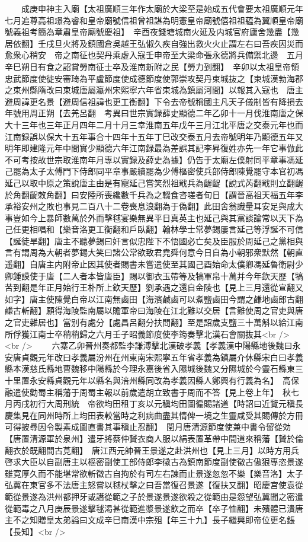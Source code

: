 　　成庚申神主入廟【太祖廣順三年作太廟於大梁至是始成五代會要太祖廣順元年七月追尊高祖璟為睿和皇帝廟號信祖曾祖諶為明憲皇帝廟號僖祖祖藴為翼順皇帝廟號義祖考簡為章肅皇帝廟號慶祖】　辛酉夜錢塘城南火延及内城官府廬舍幾盡【幾居依翻】壬戌旦火將及鎮國倉吳越王弘俶久疾自強出救火火止謂左右曰吾疾因災而愈衆心稍安　帝之南征也契丹乘虚入寇壬申帝至大梁命張永德將兵備禦北邊　五月辛巳朔日有食之詔賞勞南征士卒及淮南新附之民【勞力到翻】　辛卯以太祖皇帝領忠武節度使徙安審琦為平盧節度使成德節度使郭崇攻契丹束城抜之【束城漢勃海郡之束州縣隋改曰束城唐屬瀛州宋熙寧六年省束城為鎮屬河間】以報其入寇也　唐主避周諱更名景【避周信祖諱也更工衡翻】下令去帝號稱國主凡天子儀制皆有降損去年號用周正朔【去羌呂翻　考異曰世宗實録薛史顯德二年乙卯十一月伐淮南唐之保大十三年也三年正月四年二月十月三幸淮南五年戊午三月江北平唐之交泰元年也而江南録誤以保大十五年事合十四年十五年丁巳改交泰五月去帝號明年乃顯德五年又明年即建隆元年中間實少顯德六年江南録最為差誤其記李昇復姓亦先一年它事倣此不可考按故世宗取淮南年月專以實録及薛史為據】仍告于太廟左僕射同平章事馮延己罷為太子太傅門下侍郎同平章事嚴續罷為少傅樞密使兵部侍郎陳覺罷守本官初馮延己以取中原之策說唐主由是有寵延己嘗笑烈祖戢兵為齷齪【說式芮翻戢則立翻齷於角翻齪敇角翻】曰安陸所喪纔數千兵為之輟食咨嗟者旬日【謂晉高祖天福五年李承裕安州之敗也事見二百八十二卷喪息浪翻為于偽翻】此田舍翁識量耳安足與成大事豈如今上暴師數萬於外而擊毬宴樂無異平日真英主也延己與其黨談論常以天下為己任更相唱和【樂音洛更工衡翻和戶臥翻】翰林學士常夢錫屢言延己等浮誕不可信【誕徒旱翻】唐主不聽夢錫曰奸言似忠陛下不悟國必亡矣及臣服於周延己之黨相與言有謂周為大朝者夢錫大笑曰諸公常欲致君堯舜何意今日自為小朝邪衆默然【朝直遥翻】自唐主内附帝止因其使者賜書未嘗遣使至其國己酉始命太僕卿馮延魯衛尉少卿鍾謨使于唐【二人者本皆唐臣】賜以御衣玉帶等及犒軍帛十萬并今年欽天歷【犒苦到翻是年正月始行王朴所上欽天歷】劉承遇之還自金陵也【見上三月還從宣翻又如字】唐主使陳覺白帝以江南無鹵田【海濱鹹鹵可以煮鹽鹵田今謂之鹻地鹵郎古翻鹻古斬翻】願得海陵監南屬以贍軍帝曰海陵在江北難以交居【言難使周之官吏與唐之官吏雜居也】當别有處分【處昌呂翻分扶問翻】至是詔歲支鹽三十萬斛以給江南所俘獲江南士卒稍稍歸之六月壬子昭義節度使李筠奏擊北漢石會關抜其<br />
<br />
　　六寨乙卯晉州奏都監李謙溥擊北漢破孝義【孝義漢中陽縣地後魏曰永安唐貞觀元年改曰孝義屬汾州在州東南宋熙寧五年省孝義為鎮屬介休縣宋白曰孝義縣本漢慈氏縣地曹魏移中陽縣於今理永嘉後省入隰城後魏又分隰城於今靈石縣東三十里置永安縣貞觀元年以縣名與涪州縣同改為孝義因縣人鄭興有行義為名】　高保融遣使勸蜀主稱藩于周蜀主報以前歲遣胡立致書于周而不答【見上卷上年】　秋七月丙戌初行大周刑統　帝欲均田租丁亥以元稹均田圖徧賜諸道【時詔曰近覽元稹長慶集見在同州時所上均田表較當時之利病曲盡其情俾一境之生靈咸受其賜傳於方冊可得披尋因令製素成圖直書其事稹止忍翻】　閏月唐清源節度使兼中書令留從効【唐置清源軍於泉州】遣牙將蔡仲贇衣商人服以絹表置革帶中間道來稱藩【贇於倫翻衣於既翻間古莧翻】　唐江西元帥晉王景遂之赴洪州也【見上三月】以時方用兵啓求大臣以自副唐主以樞密副使工部侍郎李徵古為鎮南節度副使徵古傲狠專恣景遂雖寛厚久而不能堪常欲斬徵古自拘於有司左右諫而止景遂忽忽不樂【樂音洛】太子弘冀在東官多不法唐主怒嘗以毬杖擊之曰吾當復召景遂【復扶又翻】昭慶宫使袁從範從景遂為洪州都押牙或譖從範之子於景遂景遂欲殺之從範由是怨望弘冀聞之密遣從範毒之八月庚辰景遂擊毬渇甚從範進漿景遂飲之而卒【卒子恤翻】未殯體已潰唐主不之知贈皇太弟謚曰文成辛巳南漢中宗殂【年三十九】長子繼興即帝位更名鋹【長知】<br />
